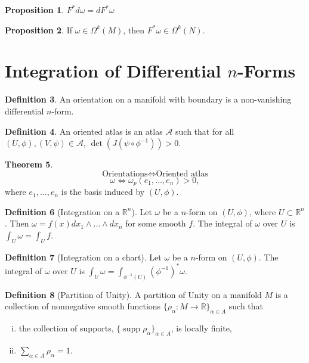 \documentclass[]{article}
\DeclareMathOperator{\Det}{det}
\DeclareMathOperator{\supp}{supp}
\theoremstyle{definition}
\newtheorem{theorem}{Theorem}[section] %
\theoremstyle{definition}
\newtheorem{definition}[theorem]{Definition} %
\newtheorem{proposition}[theorem]{Proposition}
\begin{document}
\begin{proposition}
    $F^*d\omega=dF^*\omega$
\end{proposition}

\begin{proposition}
    If $\omega\in \Omega^k(M)$, then $F^*\omega\in \Omega^k(N)$.
\end{proposition}

\section{Integration of Differential $n$-Forms}

\begin{definition}
    An orientation on a manifold with boundary is a non-vanishing differential $n$-form.
\end{definition}

\begin{definition}
    An oriented atlas is an atlas $\mathcal{A}$ such that for all $(U, \phi),(V, \psi)\in \mathcal{A}$, $\Det(J(\psi\circ\phi ^{-1}))>0$.
\end{definition}

\begin{theorem}
    \[\text{Orientations} \iff \text{Oriented atlas}\]
    \[ \omega \iff \omega_p(e_1,\dots,e_n)>0,\] where $e_1,\dots,e_n$ is the basis induced by $(U, \phi)$.
\end{theorem}

\begin{definition}[Integration on a $\mathbb{R}^n$]
    Let $\omega$ be a $n$-form on $(U, \phi)$, where $U\subset\mathbb{R}^n$. Then $\omega=f(x)dx_1\wedge\dots\wedge dx_n$ for some smooth $f$. The integral of $\omega$ over $U$ is $\int_U\omega=\int_U f$.
\end{definition}

\begin{definition}[Integration on a chart]
    Let $\omega$ be a $n$-form on $(U, \phi)$. The integral of $\omega$ over $U$ is $\int_U\omega=\int_{\phi^{-1}(U)}(\phi^{-1})^*\omega$. 
\end{definition}

\begin{definition}[Partition of Unity]
    A partition of Unity on a manifold $M$ is a collection of nonnegative smooth functions $\{\rho_\alpha:M \rightarrow \mathbb{R}\}_{\alpha\in A}$ such that
    \begin{enumerate}[(i)]
        \item the collection of supports, $\{\supp\rho_\alpha\}_{\alpha\in A}$, is locally finite,
        \item $\sum_{\alpha\in A} \rho_\alpha = 1.$
    \end{enumerate}
\end{definition}
\end{document}
